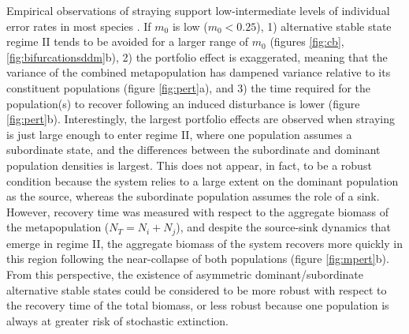 \documentclass{revtex4}
\begin{document}
Empirical observations of straying support low-intermediate levels of individual error rates in most species \citep{H:2013fs,Keefer:2014gg}.
If $m_0$ is low ($m_0<0.25$),
1) alternative stable state regime II tends to be avoided for a larger range of $m_0$ (figures \ref{fig:cb}, \ref{fig:bifurcationsddm}b),
2) the portfolio effect is exaggerated, meaning that the variance of the combined metapopulation has dampened variance relative to its constituent populations (figure \ref{fig:pert}a), and
3) the time required for the population(s) to recover following an induced disturbance is lower (figure \ref{fig:pert}b).
Interestingly, the largest portfolio effects are observed when straying is just large enough to enter regime II, where one population assumes a subordinate state, and the differences between the subordinate and dominant population densities is largest.
This does not appear, in fact, to be a robust condition because the system relies to a large extent on the dominant population as the source, whereas the subordinate population assumes the role of a sink.
However, recovery time was measured with respect to the aggregate biomass of the metapopulation ($N_T = N_i + N_j$), and despite the source-sink dynamics that emerge in regime II, the aggregate biomass of the system recovers more quickly in this region following the near-collapse of both populations (figure \ref{fig:mpert}b).
From this perspective, the existence of asymmetric dominant/subordinate alternative stable states could be considered to be more robust with respect to the recovery time of the total biomass, or less robust because one population is always at greater risk of stochastic extinction.
\end{document}
